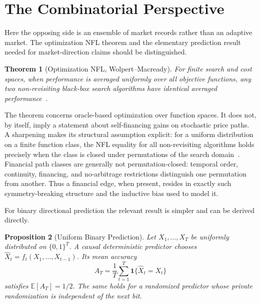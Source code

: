 \documentclass[aps,pra,reprint,superscriptaddress,amsmath,amssymb,floatfix]{revtex4-2}
\theoremstyle{plain}
\newtheorem{theorem}{Theorem}
\newtheorem{proposition}[theorem]{Proposition}
\theoremstyle{definition}
\theoremstyle{remark}
\begin{document}
\section{The Combinatorial Perspective}
\label{sec:nfl}

Here the opposing side is an ensemble of market records rather than an
adaptive market. The optimization NFL theorem and the elementary prediction
result needed for market-direction claims should be distinguished.

\begin{theorem}[Optimization NFL, Wolpert--Macready]
  \label{thm:nfl}
  For finite search and cost spaces, when performance is averaged uniformly
  over all objective functions, any two non-revisiting black-box search
  algorithms have identical averaged
  performance~\cite{Wolpert:1997:NFL:2221336.2221408}.
\end{theorem}

The theorem concerns oracle-based optimization over function spaces. It does
not, by itself, imply a statement about self-financing gains on stochastic
price paths. A sharpening makes its structural assumption explicit: for a
uniform distribution on a finite function class, the NFL equality for all
non-revisiting algorithms holds precisely when the class is closed under
permutations of the search domain~\cite{SchumacherVoseWhitley2001}. Financial
path classes are generally not permutation-closed: temporal order, continuity,
financing, and no-arbitrage restrictions distinguish one permutation from
another. Thus a financial edge, when present, resides in exactly such
symmetry-breaking structure and the inductive bias used to model it.

For binary directional prediction the relevant result is simpler and can be
derived directly.

\begin{proposition}[Uniform Binary Prediction]
  \label{prop:binary}
  Let \(X_1,\ldots,X_T\) be uniformly distributed on \(\{0,1\}^T\). A causal
  deterministic predictor chooses
  \(\widehat X_t=f_t(X_1,\ldots,X_{t-1})\). Its mean accuracy
  \[
    A_T=\frac1T\sum_{t=1}^T
      \mathbf{1}\{\widehat X_t=X_t\}
  \]
  satisfies \(\mathbb{E}[A_T]=1/2\). The same holds for a randomized predictor
  whose private randomization is independent of the next bit.
\end{proposition}
\end{document}
